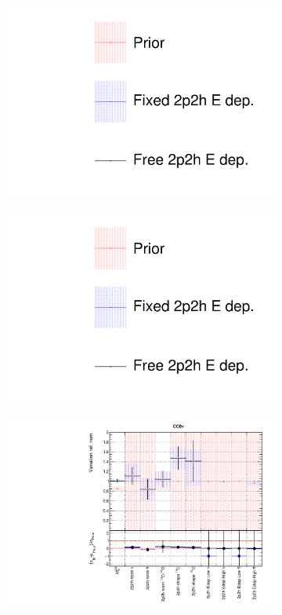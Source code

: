 \begin{figure}
\centering
\begin{subfigure}{0.3\textwidth}
  \centering
  \includegraphics[width=1.0\linewidth, trim={5mm  130mm 0mm 10mm}, clip]{figs/fixed2p2hfits_leg}
\end{subfigure}\begin{subfigure}{0.3\textwidth}
  \centering
  \includegraphics[width=1.0\linewidth, trim={5mm  0mm 0mm 70mm}, clip]{figs/fixed2p2hfits_leg}
\end{subfigure}
\begin{subfigure}{0.49\textwidth}
  \centering
  \includegraphics[width=0.9\linewidth]{figs/fixed2p2hfitsxsec1}

\end{subfigure}
\end{figure}
